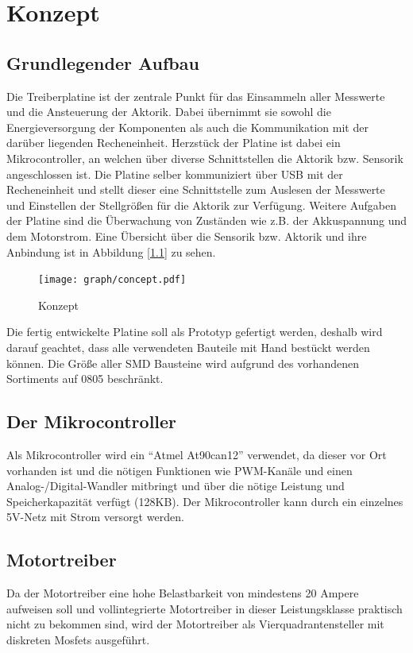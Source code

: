 
\chapter{Konzept}


\section{Grundlegender Aufbau}

Die Treiberplatine ist der zentrale Punkt für das Einsammeln aller Messwerte und die Ansteuerung der Aktorik. Dabei übernimmt sie sowohl die Energieversorgung der Komponenten als auch
die Kommunikation mit der darüber liegenden Recheneinheit. Herzstück der Platine ist dabei ein Mikrocontroller, an welchen über diverse Schnittstellen die Aktorik bzw. Sensorik
angeschlossen ist. Die Platine selber kommuniziert über USB mit der Recheneinheit und stellt dieser eine Schnittstelle zum Auslesen der Messwerte und Einstellen der Stellgrößen für die Aktorik
zur Verfügung. Weitere Aufgaben der Platine sind die Überwachung von Zuständen wie z.B. der Akkuspannung und dem Motorstrom. Eine Übersicht über die Sensorik bzw. Aktorik und ihre Anbindung ist in 
Abbildung [\ref{fig:konzept}] zu sehen.

\begin{figure}[H]
\centering
\texttt{[image: graph/concept.pdf]}\\
\caption{Konzept}
\label{fig:konzept}
\end{figure}


Die fertig entwickelte Platine soll als Prototyp gefertigt werden, deshalb wird darauf geachtet, dass alle verwendeten Bauteile mit Hand bestückt werden können.
Die Größe aller SMD Bausteine wird aufgrund des vorhandenen Sortiments auf 0805 beschränkt.


\section{Der Mikrocontroller}
Als Mikrocontroller wird ein ``Atmel At90can12''\cite{ds-at90can} verwendet, da dieser vor Ort vorhanden ist und die nötigen Funktionen wie PWM-Kanäle und einen Analog-/Digital-Wandler mitbringt und 
über die nötige Leistung und Speicherkapazität verfügt (128KB). Der Mikrocontroller kann durch ein einzelnes 5V-Netz mit Strom versorgt werden.




\section{Motortreiber}
Da der Motortreiber eine hohe Belastbarkeit von mindestens 20 Ampere aufweisen soll und
vollintegrierte Motortreiber in dieser Leistungsklasse praktisch nicht zu bekommen sind, wird der Motortreiber als Vierquadrantensteller mit diskreten Mosfets ausgeführt.

